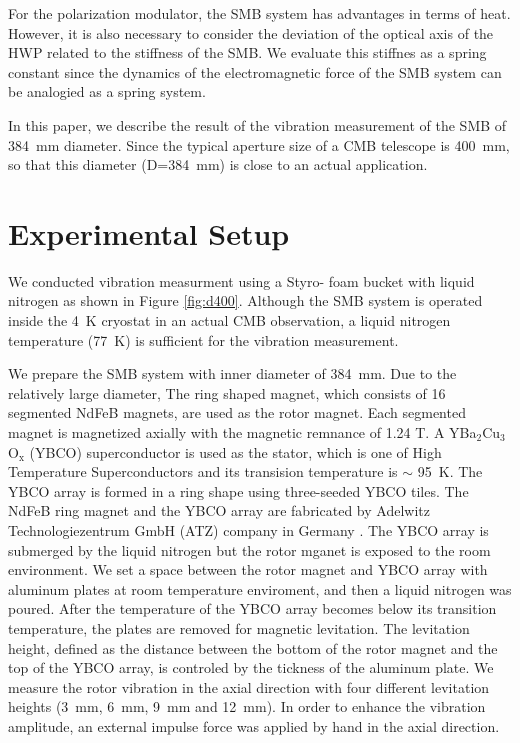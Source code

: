 \documentclass[a4paper]{jpconf}
\begin{document}
For the polarization modulator, the SMB system has advantages in terms of heat.
However, it is also necessary to consider the deviation of the optical axis of the HWP related to the stiffness of the SMB.
We evaluate this stiffnes as a spring constant since the dynamics of the electromagnetic force of the SMB system can be analogied as a spring system.

In this paper, we describe the result of the vibration measurement of the SMB of 384~mm diameter.
Since the typical aperture size of a CMB telescope is 400~mm, so that this diameter (D=384~mm) is close to an actual application.

\section*{Experimental Setup}


We conducted vibration measurment using a Styro- foam bucket with liquid nitrogen as shown in Figure \ref{fig:d400}.
Although the SMB system is operated inside the 4~K cryostat in an actual CMB observation, a liquid nitrogen temperature (77~K) is sufficient for the vibration measurement.

We prepare the SMB system with inner diameter of 384~mm.
Due to the relatively large diameter, The ring shaped magnet, which consists of 16 segmented NdFeB magnets, are used as the rotor magnet.
Each segmented magnet is magnetized axially with the magnetic remnance of 1.24 T.
A YBa$_{2}$Cu$_{3}$O$_{\mathrm{x}}$ (YBCO) superconductor is used as the stator, which is one of High Temperature Superconductors and its transision temperature is $\sim$ 95~K.
The YBCO array is formed in a ring shape using three-seeded YBCO tiles.
The NdFeB ring magnet and the YBCO array are fabricated by Adelwitz Technologiezentrum GmbH (ATZ) company in Germany \cite{ATZ}.
The YBCO array is submerged by the liquid nitrogen but the rotor mganet is exposed to the room environment.
We set a space between the rotor magnet and YBCO array with aluminum plates at room temperature enviroment, and then a liquid nitrogen was poured.
After the temperature of the YBCO array becomes below its transition temperature, the plates are removed for magnetic levitation.
The levitation height, defined as the distance between the bottom of the rotor magnet and the top of the YBCO array, is controled by the tickness of the aluminum plate.
We measure the rotor vibration in the axial direction with four different levitation heights (3~mm, 6~mm, 9~mm and 12~mm).
In order to enhance the vibration amplitude, an external impulse force was applied by hand in the axial direction.
\end{document}
